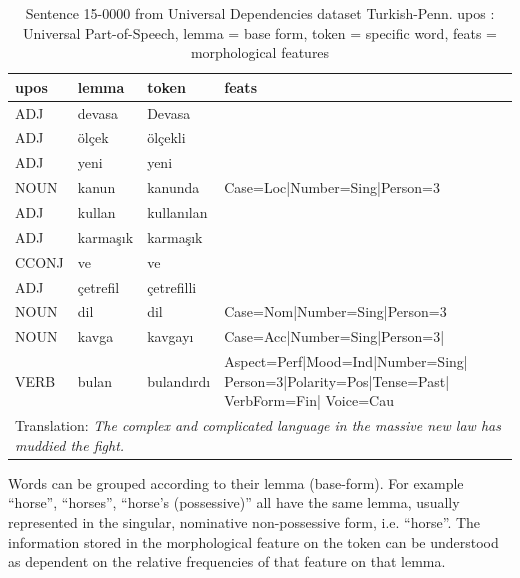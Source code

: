 \documentclass[a4paper]{article}
\begin{document}
\begin{table}[h]
    \centering
    \caption{Sentence 15-0000 from Universal Dependencies dataset Turkish-Penn. upos : Universal Part-of-Speech, lemma = base form, token = specific word, feats = morphological features} %
    \label{tab:turkish_example}   
    \begin{tabular}{p{1.5cm}p{2cm}p{2cm}p{6cm}}
\toprule
	\textbf{upos}	&	\textbf{lemma}	&	\textbf{token}	&	\textbf{feats}	\\
    \midrule
	ADJ	&	devasa	&	Devasa	&	\\    \midrule
	ADJ	&	ölçek	&	ölçekli	&\\    \midrule
ADJ	&	yeni	&	yeni	&		\\    \midrule
	NOUN	&	kanun	&	kanunda	&	Case=Loc|Number=Sing|Person=3	\\    \midrule
	ADJ	&	kullan	&	kullanılan	&		\\    \midrule
ADJ	&	karmaşık	&	karmaşık	&\\    \midrule
CCONJ	&	ve	&	ve	&		\\    \midrule
ADJ	&	çetrefil	&	çetrefilli	&		\\    \midrule
	NOUN	&	dil	&	dil	&	Case=Nom|Number=Sing|Person=3	\\    \midrule
	NOUN	&	kavga	&	kavgayı	&	Case=Acc|Number=Sing|Person=3|	\\    \midrule
	VERB	&	bulan	&	bulandırdı	&	Aspect=Perf|Mood=Ind|Number=Sing| Person=3|Polarity=Pos|Tense=Past| VerbForm=Fin| Voice=Cau	\\\midrule
   \multicolumn{4}{p{11cm}}{Translation: \textit{The complex and complicated language in the massive new law has muddied the fight.}}\\    \bottomrule


    \end{tabular}
\end{table}

Words can be grouped according to their lemma (base-form). 
For example ``horse'', ``horses'', ``horse's (possessive)'' all have the same lemma, usually represented in the singular, nominative non-possessive form, i.e. ``horse''.
The information stored in the morphological feature on the token can be understood as dependent on the relative frequencies of that feature on that lemma. 
\end{document}
